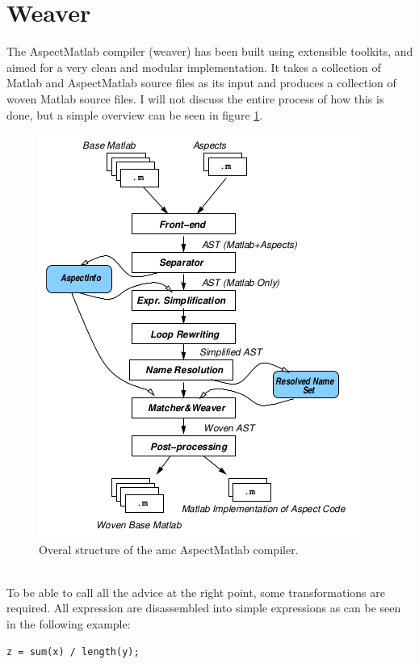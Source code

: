 \documentclass[a4paper]{report}
\begin{document}
\section{Weaver}
The AspectMatlab compiler (weaver) has been built using extensible toolkits, and aimed for a very clean and modular implementation. It takes a collection of Matlab and AspectMatlab source files as its input and produces a collection of woven Matlab source files. I will not discuss the entire process of how this is done, but a simple overview can be seen in figure \ref{fig:Matlab_Weaver}.\\
\begin{figure}
\includegraphics[scale=1]{images/Languages/Matlab_Weaver.png}
\caption{Overal structure of the amc AspectMatlab compiler.}
\label{fig:Matlab_Weaver}
\end{figure}
\\
To be able to call all the advice at the right point, some transformations are required. All expression are disassembled into simple expressions as can be seen in the following example:
\begin{minipage}{0.45\textwidth}
\begin{lstlisting}[caption=Original code.]
z = sum(x) / length(y);
\end{lstlisting}
\end{minipage}\hfill
\end{document}
